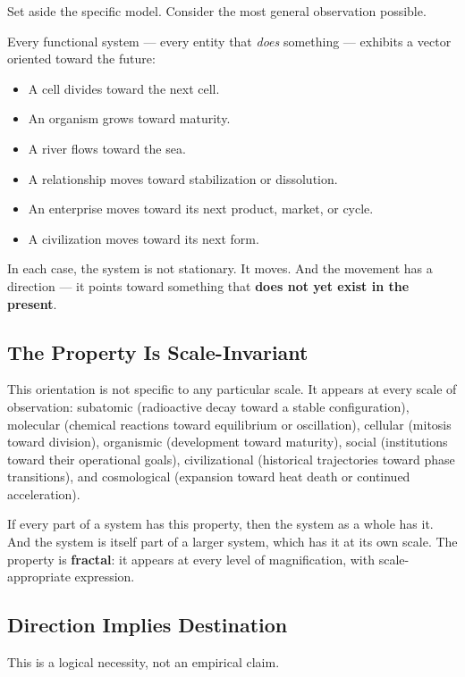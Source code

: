 \documentclass[12pt,a4paper]{article}
\begin{document}
Set aside the specific model. Consider the most general observation possible.

Every functional system --- every entity that \emph{does} something --- exhibits a vector oriented toward the future:

\begin{itemize}[leftmargin=2em]
    \item A cell divides toward the next cell.
    \item An organism grows toward maturity.
    \item A river flows toward the sea.
    \item A relationship moves toward stabilization or dissolution.
    \item An enterprise moves toward its next product, market, or cycle.
    \item A civilization moves toward its next form.
\end{itemize}

In each case, the system is not stationary. It moves. And the movement has a direction --- it points toward something that \textbf{does not yet exist in the present}.

\subsection{The Property Is Scale-Invariant}

This orientation is not specific to any particular scale. It appears at every scale of observation: subatomic (radioactive decay toward a stable configuration), molecular (chemical reactions toward equilibrium or oscillation), cellular (mitosis toward division), organismic (development toward maturity), social (institutions toward their operational goals), civilizational (historical trajectories toward phase transitions), and cosmological (expansion toward heat death or continued acceleration).

If every part of a system has this property, then the system as a whole has it. And the system is itself part of a larger system, which has it at its own scale. The property is \textbf{fractal}: it appears at every level of magnification, with scale-appropriate expression.

\subsection{Direction Implies Destination}

This is a logical necessity, not an empirical claim.
\end{document}
